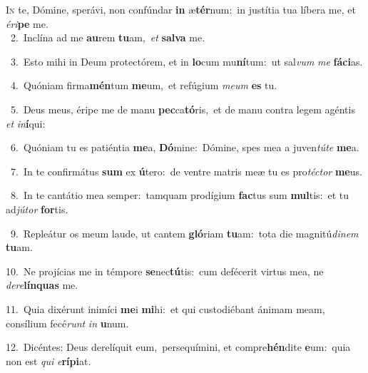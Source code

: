 \lettrine{\initial\textcolor{\initialcolor}{I}}{n} te, Dómine, sperávi, non confúndar \textbf{in} æ\-\textbf{tér}\-num:~\star in justítia tua líbera me, et \textit{é}\-\textit{ri}\textbf{pe} me.\\
{\numbfont\textcolor{\numbcolor}{~2.}}~Inclína ad me \textbf{au}\-rem \textbf{tu}\-am,~\star \textit{et} \textbf{sal}\-\textbf{va} me.\par
{\numbfont\textcolor{\numbcolor}{~3.}}~Esto mihi in Deum protectórem, et in \textbf{lo}\-cum mu\-\textbf{ní}\-tum:~\star ut sal\textit{vum} \textit{me} \textbf{fá}\-\textbf{ci}as.\par
{\numbfont\textcolor{\numbcolor}{~4.}}~Quóniam firma\-\textbf{mén}\-tum \textbf{me}\-um,~\star et refúgium \textit{me}\-\textit{um} \textbf{es} tu.\par
{\numbfont\textcolor{\numbcolor}{~5.}}~Deus meus, éripe me de manu \textbf{pec}\-ca\-\textbf{tó}\-ris,~\star et de manu contra legem agéntis \textit{et} \textit{in}\-\textbf{í}qui:\par
{\numbfont\textcolor{\numbcolor}{~6.}}~Quóniam tu es patiéntia \textbf{me}\-a, \textbf{Dó}\-mine:~\star Dómine, spes mea a juven\-\textit{tú}\-\textit{te} \textbf{me}\-a.\par
{\numbfont\textcolor{\numbcolor}{~7.}}~In te confirmátus \textbf{sum} ex \textbf{ú}\-tero:~\star de ventre matris meæ tu es pro\-\textit{téc}\-\textit{tor} \textbf{me}\-us.\par
{\numbfont\textcolor{\numbcolor}{~8.}}~In te cantátio mea semper:~\dagger tamquam prodígium \textbf{fac}\-tus sum \textbf{mul}\-tis:~\star et tu ad\-\textit{jú}\-\textit{tor} \textbf{for}\-tis.\par
{\numbfont\textcolor{\numbcolor}{~9.}}~Repleátur os meum laude, ut cantem \textbf{gló}\-riam \textbf{tu}\-am:~\star tota die magnitú\-\textit{di}\-\textit{nem} \textbf{tu}\-am.\par
{\numbfont\textcolor{\numbcolor}{10.}}~Ne projícias me in témpore \textbf{se}\-nec\-\textbf{tú}\-tis:~\star cum defécerit virtus mea, ne \textit{de}\-\textit{re}\textbf{lín}\textbf{quas} me.\par
{\numbfont\textcolor{\numbcolor}{11.}}~Quia dixérunt inimíci \textbf{me}\-i \textbf{mi}\-hi:~\star et qui custodiébant ánimam meam, consílium fecé\textit{runt} \textit{in} \textbf{u}\-num.\par
{\numbfont\textcolor{\numbcolor}{12.}}~Dicéntes: Deus derelíquit eum,~\dagger persequímini, et compre\-\textbf{hén}\-dite \textbf{e}\-um:~\star quia non est \textit{qui} \textit{e}\-\textbf{rí}\textbf{pi}at.\par
